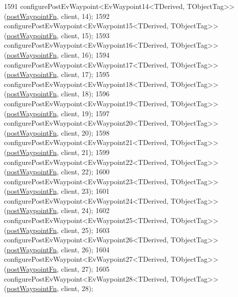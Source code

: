 \begin{DoxyCode}
1591     configurePostEvWaypoint<EvWaypoint14<TDerived, TObjectTag>>(\hyperlink{classsmacc_1_1WaypointEventDispatcher_a6bccf6a93a827634b7b5e67ac0e4ec57}{postWaypointFn}, client, 14);
1592     configurePostEvWaypoint<EvWaypoint15<TDerived, TObjectTag>>(\hyperlink{classsmacc_1_1WaypointEventDispatcher_a6bccf6a93a827634b7b5e67ac0e4ec57}{postWaypointFn}, client, 15);
1593     configurePostEvWaypoint<EvWaypoint16<TDerived, TObjectTag>>(\hyperlink{classsmacc_1_1WaypointEventDispatcher_a6bccf6a93a827634b7b5e67ac0e4ec57}{postWaypointFn}, client, 16);
1594     configurePostEvWaypoint<EvWaypoint17<TDerived, TObjectTag>>(\hyperlink{classsmacc_1_1WaypointEventDispatcher_a6bccf6a93a827634b7b5e67ac0e4ec57}{postWaypointFn}, client, 17);
1595     configurePostEvWaypoint<EvWaypoint18<TDerived, TObjectTag>>(\hyperlink{classsmacc_1_1WaypointEventDispatcher_a6bccf6a93a827634b7b5e67ac0e4ec57}{postWaypointFn}, client, 18);
1596     configurePostEvWaypoint<EvWaypoint19<TDerived, TObjectTag>>(\hyperlink{classsmacc_1_1WaypointEventDispatcher_a6bccf6a93a827634b7b5e67ac0e4ec57}{postWaypointFn}, client, 19);
1597     configurePostEvWaypoint<EvWaypoint20<TDerived, TObjectTag>>(\hyperlink{classsmacc_1_1WaypointEventDispatcher_a6bccf6a93a827634b7b5e67ac0e4ec57}{postWaypointFn}, client, 20);
1598     configurePostEvWaypoint<EvWaypoint21<TDerived, TObjectTag>>(\hyperlink{classsmacc_1_1WaypointEventDispatcher_a6bccf6a93a827634b7b5e67ac0e4ec57}{postWaypointFn}, client, 21);
1599     configurePostEvWaypoint<EvWaypoint22<TDerived, TObjectTag>>(\hyperlink{classsmacc_1_1WaypointEventDispatcher_a6bccf6a93a827634b7b5e67ac0e4ec57}{postWaypointFn}, client, 22);
1600     configurePostEvWaypoint<EvWaypoint23<TDerived, TObjectTag>>(\hyperlink{classsmacc_1_1WaypointEventDispatcher_a6bccf6a93a827634b7b5e67ac0e4ec57}{postWaypointFn}, client, 23);
1601     configurePostEvWaypoint<EvWaypoint24<TDerived, TObjectTag>>(\hyperlink{classsmacc_1_1WaypointEventDispatcher_a6bccf6a93a827634b7b5e67ac0e4ec57}{postWaypointFn}, client, 24);
1602     configurePostEvWaypoint<EvWaypoint25<TDerived, TObjectTag>>(\hyperlink{classsmacc_1_1WaypointEventDispatcher_a6bccf6a93a827634b7b5e67ac0e4ec57}{postWaypointFn}, client, 25);
1603     configurePostEvWaypoint<EvWaypoint26<TDerived, TObjectTag>>(\hyperlink{classsmacc_1_1WaypointEventDispatcher_a6bccf6a93a827634b7b5e67ac0e4ec57}{postWaypointFn}, client, 26);
1604     configurePostEvWaypoint<EvWaypoint27<TDerived, TObjectTag>>(\hyperlink{classsmacc_1_1WaypointEventDispatcher_a6bccf6a93a827634b7b5e67ac0e4ec57}{postWaypointFn}, client, 27);
1605     configurePostEvWaypoint<EvWaypoint28<TDerived, TObjectTag>>(\hyperlink{classsmacc_1_1WaypointEventDispatcher_a6bccf6a93a827634b7b5e67ac0e4ec57}{postWaypointFn}, client, 28);

\end{DoxyCode}
